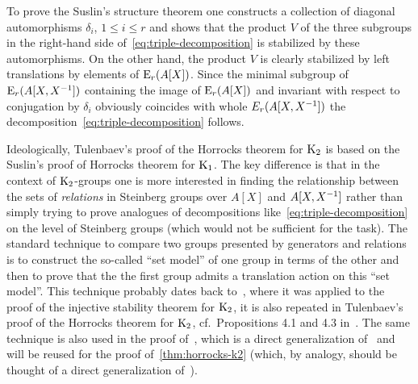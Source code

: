 To prove the Suslin's structure theorem one constructs a collection of diagonal automorphisms $\delta_i$, $1\leq i\leq r$
 and shows that the product $V$ of the three subgroups in the right-hand side of~\eqref{eq:triple-decomposition} is stabilized by these automorphisms.
On the other hand, the product $V$ is clearly stabilized by left translations by elements of $\operatorname{E}_r(A[X])$.
Since the minimal subgroup of $\operatorname{E}_r(A[X, X^{-1}])$ containing the image of $\operatorname{E}_r(A[X])$ and invariant with respect to conjugation by $\delta_i$
 obviously coincides with whole $E_r(A[X, X^{-1}])$ the decomposition~\eqref{eq:triple-decomposition} follows.

Ideologically, Tulenbaev's proof of the Horrocks theorem for $\operatorname{K}_2$ is based on the Suslin's proof of Horrocks theorem for $\operatorname{K}_1$.
The key difference is that in the context of $\operatorname{K}_2$-groups one is more interested in finding the relationship between the sets of \textit{relations} in Steinberg groups over $A[X]$ and $A[X, X^{-1}]$
 rather than simply trying to prove analogues of decompositions like~\eqref{eq:triple-decomposition} on the level of Steinberg groups (which would not be sufficient for the task).
The standard technique to compare two groups presented by generators and relations is to construct the so-called ``set model''
 of one group in terms of the other and then to prove that the the first group admits a translation action on this ``set model''.
This technique probably dates back to~\cite{ST76}, where it was applied to the proof of the injective stability theorem for $\operatorname{K}_2$, it is also repeated
 in Tulenbaev's proof of the Horrocks theorem for $\operatorname{K}_2$, cf.\ Propositions 4.1 and 4.3 in~\cite{Tu83}.
The same technique is also used in the proof of~\cite[Theorem~3]{LS20}, which is a direct generalization of~\cite[Proposition~4.3]{Tu83}
 and will be reused for the proof of~\cref{thm:horrocks-k2} (which, by analogy, should be thought of a direct generalization of~\cite[Proposition~4.1]{Tu83}).

